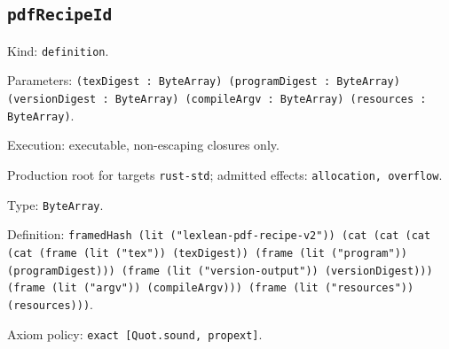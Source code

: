 \documentclass[11pt]{article}
\begin{document}
\subsection*{\texttt{pdfRecipeId}}
\noindent Kind: \texttt{definition}.\par
\noindent Parameters: \texttt{(texDigest : ByteArray) (programDigest : ByteArray) (versionDigest : ByteArray) (compileArgv : ByteArray) (resources : ByteArray)}.\par
\noindent Execution: executable, non-escaping closures only.\par
\noindent Production root for targets \texttt{rust-std}; admitted effects: \texttt{allocation, overflow}.\par
\noindent Type: \texttt{ByteArray}.\par
\noindent Definition: \texttt{framedHash (lit ("lexlean-pdf-recipe-v2")) (cat (cat (cat (cat (frame (lit ("tex")) (texDigest)) (frame (lit ("program")) (programDigest))) (frame (lit ("version-output")) (versionDigest))) (frame (lit ("argv")) (compileArgv))) (frame (lit ("resources")) (resources)))}.\par
\noindent Axiom policy: \texttt{exact [Quot.sound, propext]}.\par
\end{document}
